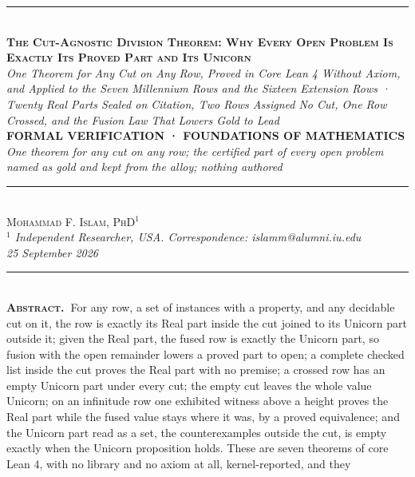 \documentclass[10pt]{article}
\begin{document}
{%
\begin{center}
{\color{accent}\rule{0.6\textwidth}{0.8pt}}\\[10pt]
{\bfseries\scshape\fontsize{20}{23}\selectfont The Cut-Agnostic Division
Theorem: Why Every Open Problem Is Exactly Its Proved Part and Its
Unicorn}\\[7pt]
{\itshape\large One Theorem for Any Cut on Any Row, Proved in Core Lean
4 Without Axiom, and Applied to the Seven Millennium Rows and the
Sixteen Extension Rows · Twenty Real Parts Sealed on Citation, Two Rows
Assigned No Cut, One Row Crossed, and the Fusion Law That Lowers Gold to
Lead}\\[8pt]
{\footnotesize\color{accent}\scshape\bfseries FORMAL VERIFICATION ·
FOUNDATIONS OF MATHEMATICS}\\[3pt]
{\itshape\color{deep}\small One theorem for any cut on any row; the
certified part of every open problem named as gold and kept from the
alloy; nothing authored}\\[9pt]
{\color{accent}\rule{0.6\textwidth}{0.8pt}}\\[10pt]
{\scshape Mohammad F. Islam, PhD\(^{1}\)}\\[2pt]
{\itshape\color{faint}\small \(^{1}\) Independent Researcher, USA.
Correspondence: islamm@alumni.iu.edu}\\[2pt]
{\itshape\color{faint}\small 25 September 2026}\\[14pt]
\end{center}
\begin{minipage}{\textwidth}
{\color{accent}\rule{\textwidth}{0.6pt}}\\[4pt]
{\small\hspace{1em}\textbf{\scshape\color{deep}Abstract.\ }For any row,
a set of instances with a property, and any decidable cut on it, the row
is exactly its Real part inside the cut joined to its Unicorn part
outside it; given the Real part, the fused row is exactly the Unicorn
part, so fusion with the open remainder lowers a proved part to open; a
complete checked list inside the cut proves the Real part with no
premise; a crossed row has an empty Unicorn part under every cut; the
empty cut leaves the whole value Unicorn; on an infinitude row one
exhibited witness above a height proves the Real part while the fused
value stays where it was, by a proved equivalence; and the Unicorn part
read as a set, the counterexamples outside the cut, is empty exactly
when the Unicorn proposition holds. These are seven theorems of core
Lean 4, with no library and no axiom at all, kernel-reported, and they
}
\end{minipage}}
\end{document}
